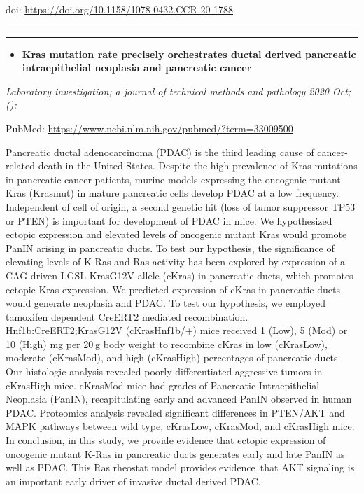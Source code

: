 \documentclass[
]{article}
\providecommand{\tightlist}{%
  \setlength{\itemsep}{0pt}\setlength{\parskip}{0pt}}
\begin{document}
doi: \url{https://doi.org/10.1158/1078-0432.CCR-20-1788}

\begin{center}\rule{0.5\linewidth}{0.5pt}\end{center}

\begin{center}\rule{0.5\linewidth}{0.5pt}\end{center}

\begin{itemize}
\tightlist
\item
  \textbf{Kras mutation rate precisely orchestrates ductal derived
  pancreatic intraepithelial neoplasia and pancreatic cancer}
\end{itemize}

\emph{Laboratory investigation; a journal of technical methods and
pathology 2020 Oct;():}

PubMed: \url{https://www.ncbi.nlm.nih.gov/pubmed/?term=33009500}

Pancreatic ductal adenocarcinoma (PDAC) is the third leading cause of
cancer-related death in the United States. Despite the high prevalence
of Kras mutations in pancreatic cancer patients, murine models
expressing the oncogenic mutant Kras (Krasmut) in mature pancreatic
cells develop PDAC at a low frequency. Independent of cell of origin, a
second genetic hit (loss of tumor suppressor TP53 or PTEN) is important
for development of PDAC in mice. We hypothesized ectopic expression and
elevated levels of oncogenic mutant Kras would promote PanIN arising in
pancreatic ducts. To test our hypothesis, the significance of elevating
levels of K-Ras and Ras activity has been explored by expression of a
CAG driven LGSL-KrasG12V allele (cKras) in pancreatic ducts, which
promotes ectopic Kras expression. We predicted expression of cKras in
pancreatic ducts would generate neoplasia and PDAC. To test our
hypothesis, we employed tamoxifen dependent CreERT2 mediated
recombination. Hnf1b:CreERT2;KrasG12V (cKrasHnf1b/+) mice received 1
(Low), 5 (Mod) or 10 (High) mg per 20 g body weight to recombine cKras
in low (cKrasLow), moderate (cKrasMod), and high (cKrasHigh) percentages
of pancreatic ducts. Our histologic analysis revealed poorly
differentiated aggressive tumors in cKrasHigh mice. cKrasMod mice had
grades of Pancreatic Intraepithelial Neoplasia (PanIN), recapitulating
early and advanced PanIN observed in human PDAC. Proteomics analysis
revealed significant differences in PTEN/AKT and MAPK pathways between
wild type, cKrasLow, cKrasMod, and cKrasHigh mice. In conclusion, in
this study, we provide evidence that ectopic expression of oncogenic
mutant K-Ras in pancreatic ducts generates early and late PanIN as well
as PDAC. This Ras rheostat model provides evidence~that AKT signaling is
an important early driver of invasive ductal derived PDAC.
\end{document}
